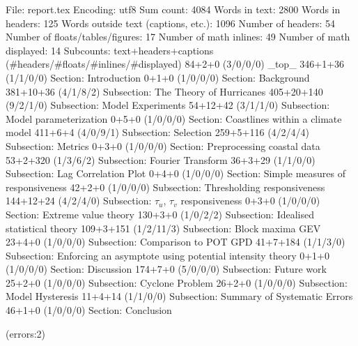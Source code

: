 
File: report.tex
Encoding: utf8
Sum count: 4084
Words in text: 2800
Words in headers: 125
Words outside text (captions, etc.): 1096
Number of headers: 54
Number of floats/tables/figures: 17
Number of math inlines: 49
Number of math displayed: 14
Subcounts:
  text+headers+captions (#headers/#floats/#inlines/#displayed)
  84+2+0 (3/0/0/0) _top_
  346+1+36 (1/1/0/0) Section: Introduction
  0+1+0 (1/0/0/0) Section: Background
  381+10+36 (4/1/8/2) Subsection: The Theory of Hurricanes
  405+20+140 (9/2/1/0) Subsection: Model Experiments
  54+12+42 (3/1/1/0) Subsection: Model parameterization
  0+5+0 (1/0/0/0) Section: Coastlines within a climate model
  411+6+4 (4/0/9/1) Subsection: Selection
  259+5+116 (4/2/4/4) Subsection: Metrics
  0+3+0 (1/0/0/0) Section: Preprocessing coastal data
  53+2+320 (1/3/6/2) Subsection: Fourier Transform
  36+3+29 (1/1/0/0) Subsection: Lag Correlation Plot
  0+4+0 (1/0/0/0) Section: Simple measures of responsiveness
  42+2+0 (1/0/0/0) Subsection: Thresholding responsiveness
  144+12+24 (4/2/4/0) Subsection: $\tau_u$, $\tau_v$ responsiveness
  0+3+0 (1/0/0/0) Section: Extreme value theory
  130+3+0 (1/0/2/2) Subsection: Idealised statistical theory
  109+3+151 (1/2/11/3) Subsection: Block maxima GEV
  23+4+0 (1/0/0/0) Subsection: Comparison to POT GPD
  41+7+184 (1/1/3/0) Subsection: Enforcing an asymptote using potential intensity theory 
  0+1+0 (1/0/0/0) Section: Discussion
  174+7+0 (5/0/0/0) Subsection: Future work
  25+2+0 (1/0/0/0) Subsection: Cyclone Problem
  26+2+0 (1/0/0/0) Subsection: Model Hysteresis
  11+4+14 (1/1/0/0) Subsection: Summary of Systematic Errors
  46+1+0 (1/0/0/0) Section: Conclusion

(errors:2)
